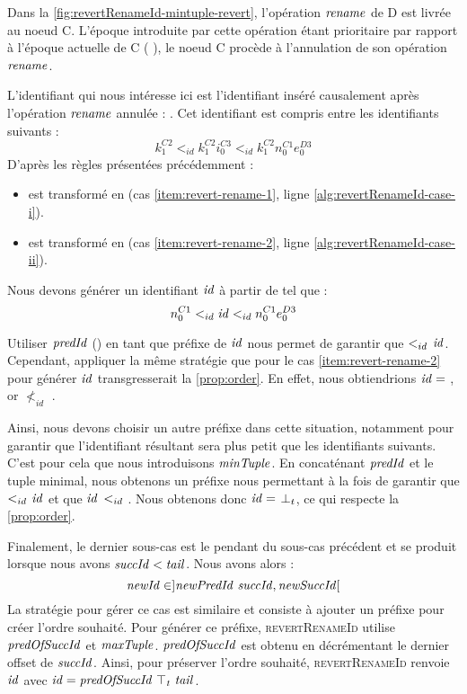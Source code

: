 Dans la \autoref{fig:revertRenameId-mintuple-revert}, l'opération $\mathit{rename}$ de D est livrée au noeud C.
L'époque introduite par cette opération étant prioritaire par rapport à l'époque actuelle de C ( \lepoch {}), le noeud C procède à l'annulation de son opération $\mathit{rename}$.

L'identifiant qui nous intéresse ici est l'identifiant inséré causalement après l'opération $\mathit{rename}$ annulée : .
Cet identifiant est compris entre les identifiants suivants :
\[k^{C2}_{1} <_{id} k^{C2}_{1}i^{C3}_{0} <_{id} k^{C2}_{1}n^{C1}_{0}e^{D3}_{0}\]
D'après les règles présentées précédemment :
\begin{itemize}
  \item {} est transformé en  (cas \ref{item:revert-rename-1}, ligne \ref{alg:revertRenameId-case-i}).
  \item {} est transformé en  (cas \ref{item:revert-rename-2}, ligne \ref{alg:revertRenameId-case-ii}).
\end{itemize}
Nous devons générer un identifiant $\mathit{id}$ à partir de  tel que :
\[n^{C1}_{0} <_{id} \mathit{id} <_{id} n^{C1}_{0}e^{D3}_{0}\]

Utiliser $\mathit{predId}$ () en tant que préfixe de $\mathit{id}$ nous permet de garantir que  $<_{id}$ $\mathit{id}$.
Cependant, appliquer la même stratégie que pour le cas \ref{item:revert-rename-2} pour générer $\mathit{id}$ transgresserait la \autoref{prop:order}.
En effet, nous obtiendrions $\mathit{id} = $ , or  $\nless_{id}$ .

Ainsi, nous devons choisir un autre préfixe dans cette situation, notamment pour garantir que l'identifiant résultant sera plus petit que les identifiants suivants.
C'est pour cela que nous introduisons $\mathit{minTuple}$.
En concaténant $\mathit{predId}$ et le tuple minimal, nous obtenons un préfixe nous permettant à la fois de garantir que  $<_{id}$ $\mathit{id}$ et que $\mathit{id}$ $<_{id}$ .
Nous obtenons donc $\mathit{id} = $ $\bot_t$, ce qui respecte la \autoref{prop:order}.

Finalement, le dernier sous-cas est le pendant du sous-cas précédent et se produit lorsque nous avons $\mathit{succId} < \mathit{tail}$.
Nous avons alors :
\[\mathit{newId} \in ]\mathit{newPredId~succId}, \mathit{newSuccId}[\]
La stratégie pour gérer ce cas est similaire et consiste à ajouter un préfixe pour créer l'ordre souhaité.
Pour générer ce préfixe, \textsc{revertRenameId} utilise  $\mathit{predOfSuccId}$ et $\mathit{maxTuple}$.
$\mathit{predOfSuccId}$ est obtenu en décrémentant le dernier offset de $\mathit{succId}$.
Ainsi, pour préserver l'ordre souhaité, \textsc{revertRenameId} renvoie $\mathit{id}$ avec $\mathit{id} = \mathit{predOfSuccId~\top_t~tail}$.

